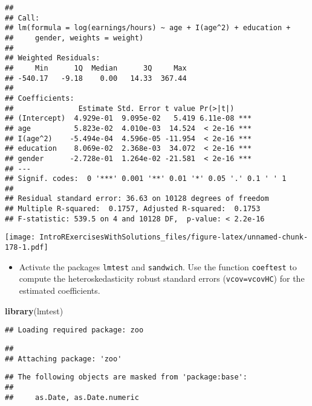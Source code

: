\documentclass[]{article}
\newenvironment{Shaded}{\begin{snugshade}}{\end{snugshade}}
\newcommand{\KeywordTok}[1]{\textcolor[rgb]{0.13,0.29,0.53}{\textbf{#1}}}
\newcommand{\OperatorTok}[1]{\textcolor[rgb]{0.81,0.36,0.00}{\textbf{#1}}}
\newcommand{\NormalTok}[1]{#1}
\providecommand{\tightlist}{%
  \setlength{\itemsep}{0pt}\setlength{\parskip}{0pt}}
\begin{document}
\begin{verbatim}
## 
## Call:
## lm(formula = log(earnings/hours) ~ age + I(age^2) + education + 
##     gender, weights = weight)
## 
## Weighted Residuals:
##     Min      1Q  Median      3Q     Max 
## -540.17   -9.18    0.00   14.33  367.44 
## 
## Coefficients:
##               Estimate Std. Error t value Pr(>|t|)    
## (Intercept)  4.929e-01  9.095e-02   5.419 6.11e-08 ***
## age          5.823e-02  4.010e-03  14.524  < 2e-16 ***
## I(age^2)    -5.494e-04  4.596e-05 -11.954  < 2e-16 ***
## education    8.069e-02  2.368e-03  34.072  < 2e-16 ***
## gender      -2.728e-01  1.264e-02 -21.581  < 2e-16 ***
## ---
## Signif. codes:  0 '***' 0.001 '**' 0.01 '*' 0.05 '.' 0.1 ' ' 1
## 
## Residual standard error: 36.63 on 10128 degrees of freedom
## Multiple R-squared:  0.1757, Adjusted R-squared:  0.1753 
## F-statistic: 539.5 on 4 and 10128 DF,  p-value: < 2.2e-16
\end{verbatim}

\begin{Shaded}
\end{Shaded}

\texttt{[image: IntroRExercisesWithSolutions\_files/figure-latex/unnamed-chunk-178-1.pdf]}

\begin{itemize}
\tightlist
\item
  Activate the packages \texttt{lmtest} and \texttt{sandwich}. Use the
  function \texttt{coeftest} to compute the heteroskedasticity robust
  standard errors (\texttt{vcov=vcovHC}) for the estimated coefficients.
\end{itemize}

\begin{Shaded}
\begin{Highlighting}[]
\KeywordTok{library}\NormalTok{(lmtest)}
\end{Highlighting}
\end{Shaded}

\begin{verbatim}
## Loading required package: zoo
\end{verbatim}

\begin{verbatim}
## 
## Attaching package: 'zoo'
\end{verbatim}

\begin{verbatim}
## The following objects are masked from 'package:base':
## 
##     as.Date, as.Date.numeric
\end{verbatim}
\end{document}
